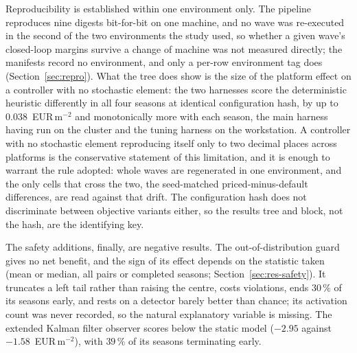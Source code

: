 Reproducibility is established within one environment only. The pipeline reproduces nine
digests bit-for-bit on one machine, and no wave was re-executed in the second of the two
environments the study used, so whether a given wave's closed-loop margins survive a
change of machine was not measured directly; the manifests record no environment, and
only a per-row environment tag does (Section~\ref{sec:repro}). What the tree does show is
the size of the platform effect on a controller with no stochastic element: the two harnesses score the deterministic heuristic
differently in all four seasons at identical configuration hash, by up to
$0.038$~EUR\,m$^{-2}$ and monotonically more with each season, the main harness having
run on the cluster and the tuning harness on the workstation. A controller with no
stochastic element reproducing itself only to two decimal places across platforms is the
conservative statement of this limitation, and it is enough to warrant the rule adopted:
whole waves are regenerated in one environment, and the only cells that cross the two,
the seed-matched priced-minus-default differences, are read against that drift.
The configuration hash does not discriminate between objective variants either, so the
results tree and block, not the hash, are the identifying key.

The safety additions, finally, are negative results. The out-of-distribution guard gives
no net benefit, and the sign of its effect depends on the statistic taken (mean or median,
all pairs or completed seasons; Section~\ref{sec:res-safety}). It truncates a left tail
rather than raising the centre, costs violations, ends $30\,\%$ of its seasons early, and
rests on a detector barely better than chance; its activation count was never recorded, so
the natural explanatory variable is missing. The extended Kalman filter observer scores
below the static model ($-2.95$ against $-1.58$~EUR\,m$^{-2}$), with $39\,\%$ of its
seasons terminating early.

